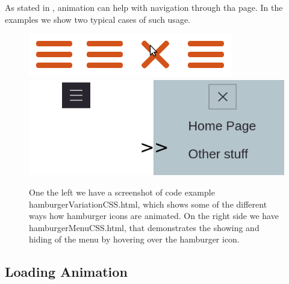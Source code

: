 As stated in , animation can help with navigation through tha page. In the examples we show two typical cases of such usage.

\label{subsub:hamburger}

\citet{vtldesign}
\citep{vtldesign}

\begin{figure}[tp]
\centering
\includegraphics[keepaspectratio,scale=0.5]{images/hamburgerVar.png}
\includegraphics[keepaspectratio,scale=0.5]{images/hamburgerMenu.png}

\caption[Hamburger Examples]{
One the left we have a screenshot of code example hamburgerVariationCSS.html, which shows some of the different ways how hamburger icons are animated. On the right side we have hamburgerMenuCSS.html, that demonstrates the showing and hiding of the menu by hovering over the hamburger icon.
}
\label{fig:hamburger}
\end{figure}



\label{subsub:menu}


\subsection{Loading Animation} %
\label{sub:loadingCSS}

